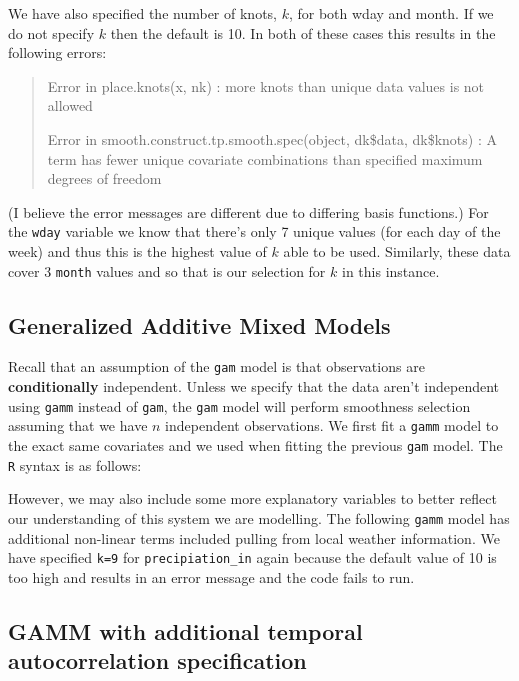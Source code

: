\documentclass[
]{book}
\begin{document}
We have also specified the number of knots, \(k\), for both wday and month. If we do not specify \(k\) then the default is 10. In both of these cases this results in the following errors:

\begin{quote}
Error in place.knots(x, nk) :
more knots than unique data values is not allowed

Error in smooth.construct.tp.smooth.spec(object, dk\$data, dk\$knots) :
A term has fewer unique covariate combinations than specified maximum degrees of freedom
\end{quote}

(I believe the error messages are different due to differing basis functions.) For the \texttt{wday} variable we know that there's only 7 unique values (for each day of the week) and thus this is the highest value of \(k\) able to be used. Similarly, these data cover 3 \texttt{month} values and so that is our selection for \(k\) in this instance.

\hypertarget{generalized-additive-mixed-models}{%
\subsection{Generalized Additive Mixed Models}\label{generalized-additive-mixed-models}}

Recall that an assumption of the \texttt{gam} model is that observations are \textbf{conditionally} independent. Unless we specify that the data aren't independent using \texttt{gamm} instead of \texttt{gam}, the \texttt{gam} model will perform smoothness selection assuming that we have \(n\) independent observations.
We first fit a \texttt{gamm} model to the exact same covariates and we used when fitting the previous \texttt{gam} model. The \texttt{R} syntax is as follows:

However, we may also include some more explanatory variables to better reflect our understanding of this system we are modelling. The following \texttt{gamm} model has additional non-linear terms included pulling from local weather information. We have specified \texttt{k=9} for \texttt{precipiation\_in} again because the default value of 10 is too high and results in an error message and the code fails to run.

\hypertarget{gamm-with-additional-temporal-autocorrelation-specification}{%
\subsection{GAMM with additional temporal autocorrelation specification}\label{gamm-with-additional-temporal-autocorrelation-specification}}
\end{document}
